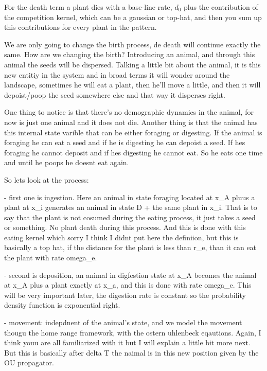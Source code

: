 \documentclass[10pt]{extarticle}
\begin{document}
For the death term a plant dies with a base-line rate, $d_0$ plus the contribution of the competition kernel, which can be a gaussian or top-hat, and then you sum up this contributions for every plant in the pattern.

We are only going to change the birth process, de death will continue exactly the same. How are we changing the birth? Introducing an animal, and through this animal the seeds will be dispersed. Talking a little bit about the animal, it is this new entitiy in the system and in broad terms it will wonder around the landscape, sometimes he will eat a plant, then he'll move a little, and then it will depoist/poop the seed somewhere else and that way it disperses right.

One thing to notice is that there's no demographic dynamics in the animal, for now is just one animal and it does not die. Another thing is that the animal has this internal state varible that can be either foraging or digesting. If the animal is foraging he can eat a seed and if he is digesting he can depoist a seed. If hes foraging he cannot deposit and if hes digesting he cannot eat. So he eats one time and until he poops he doesnt eat again.

So lets look at the process:

- first one is ingestion. Here an animal in state foraging located at x_A pluus a plant at x_i generates an animal in state D + the same plant in x_i. That is to say that the plant is not cosumed during the eating process, it just takes a seed or something. No plant death during this process. And this is done with this eating kernel which sorry I think I didnt put here the definiion, but this is basically a top hat, if the distance for the plant is less than r_e, than it can eat the plant with rate omega_e.

- second is deposition, an animal in digfestion state at x_A becomes the animal at x_A plus a plant exactly at x_a, and this is done with rate omega_e. This will be very important later, the digestion rate is constant so the probability density function is exponential right.

- movement: indepdnent of the animal's state, and we model the movement thougu the home range framework, with the ostern uhlenbeck eqautions. Again, I think youu are all familiarized with it but I will explain a little bit more next. But this is basically after delta T the naimal is in this new position given by the OU propagator. 
\end{document}
